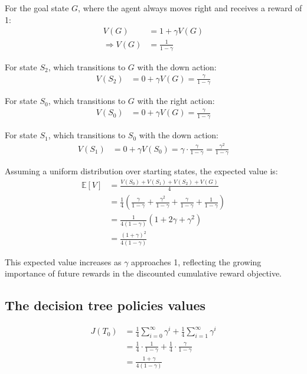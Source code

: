 For the goal state $G$, where the agent always moves right and receives a reward of 1:
\begin{align}
V(G) &= 1 + \gamma V(G) \\
\Rightarrow V(G) &= \frac{1}{1-\gamma}
\end{align}

For state $S_2$, which transitions to $G$ with the down action:
\begin{align}
V(S_2) &= 0 + \gamma V(G) = \frac{\gamma}{1-\gamma}
\end{align}

For state $S_0$, which transitions to $G$ with the right action:
\begin{align}
V(S_0) &= 0 + \gamma V(G) = \frac{\gamma}{1-\gamma}
\end{align}

For state $S_1$, which transitions to $S_0$ with the down action:
\begin{align}
V(S_1) &= 0 + \gamma V(S_0) = \gamma \cdot \frac{\gamma}{1-\gamma} = \frac{\gamma^2}{1-\gamma}
\end{align}

Assuming a uniform distribution over starting states, the expected value is:
\begin{align}
\mathbb{E}[V] &= \frac{V(S_0) + V(S_1) + V(S_2) + V(G)}{4} \\
&= \frac{1}{4} \left( \frac{\gamma}{1-\gamma} + \frac{\gamma^2}{1-\gamma} + \frac{\gamma}{1-\gamma} + \frac{1}{1-\gamma} \right) \\
&= \frac{1}{4(1-\gamma)} \left( 1 + 2\gamma + \gamma^2 \right) \\
&= \frac{{(1 + \gamma)}^2}{4(1-\gamma)}
\end{align}

This expected value increases as $\gamma$ approaches 1, reflecting the growing importance of future rewards in the discounted cumulative reward objective.

\subsection{The decision tree policies values}
\begin{align}
J(T_0) &= \frac{1}{4}\sum_{i=0}^\infty \gamma^i + \frac{1}{4}\sum_{i=1}^\infty \gamma^i \\
&= \frac{1}{4} \cdot \frac{1}{1-\gamma} + \frac{1}{4} \cdot \frac{\gamma}{1-\gamma} \\
&= \frac{1 + \gamma}{4(1-\gamma)}
\end{align}

